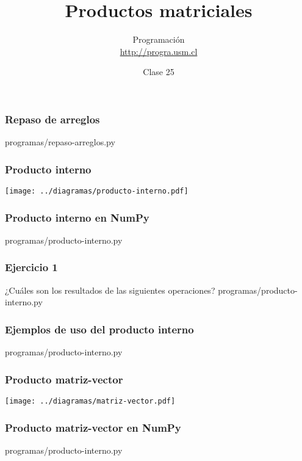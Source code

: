\documentclass[12pt]{beamer}
\title{Productos matriciales}
\author{
  Programación \\ \url{http://progra.usm.cl}
}
\date{Clase 25}
\begin{document}
  \begin{frame}
    \maketitle
  \end{frame}

  \begin{frame}
    \label{repaso-arreglos}
    \frametitle{Repaso de arreglos}
        {programas/repaso-arreglos.py}
  \end{frame}

  \begin{frame}
    \label{producto-interno}
    \frametitle{Producto interno}
    \texttt{[image: ../diagramas/producto-interno.pdf]}
  \end{frame}

  \begin{frame}
    \label{producto-interno-numpy}
    \frametitle{Producto interno en NumPy}
    
        {programas/producto-interno.py}
  \end{frame}

  \begin{frame}
    \label{ejercicios-producto-interno}
    \frametitle{Ejercicio 1}
    ¿Cuáles son los resultados
    de las siguientes operaciones?
        {programas/producto-interno.py}
  \end{frame}

  \begin{frame}
    \label{ejemplos-producto-interno}
    \frametitle{Ejemplos de uso del producto interno}
        {programas/producto-interno.py}
  \end{frame}

  \begin{frame}
    \label{producto-matriz-vector}
    \frametitle{Producto matriz-vector}
    \texttt{[image: ../diagramas/matriz-vector.pdf]}
  \end{frame}

  \begin{frame}
    \label{producto-matriz-vector-numpy}
    \frametitle{Producto matriz-vector en NumPy}
    
        {programas/producto-interno.py}
  \end{frame}
\end{document}

